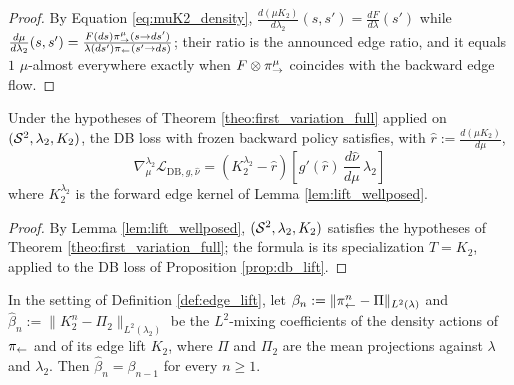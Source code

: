\begin{proof}
By Equation \eqref{eq:muK2_density}, $\frac{d(\mu K_2)}{d\lambda_2}(s,s') = \frac{dF}{d\lambda}(s')$ while $\frac{d\mu}{d\lambda_2}(s,s') = \frac{F(ds)\pi_{\rightarrow}^\mu(s\rightarrow ds')}{\lambda(ds')\pi_{\leftarrow}(s'\rightarrow ds)}$; their ratio is the announced edge ratio, and it equals $1$ $\mu$-almost everywhere exactly when $F\otimes\pi_{\rightarrow}^\mu$ coincides with the backward edge flow.
\end{proof}

\begin{corollary}[DB gradient]\label{cor:db_gradient}
Under the hypotheses of Theorem \ref{theo:first_variation_full} applied on $(\mathcal S^2,\lambda_2, K_2)$, the DB loss with frozen backward policy satisfies, with $\widehat r := \frac{d(\mu K_2)}{d\mu}$,
\begin{equation}
    \nabla^{\lambda_2}_{\mu} \mathcal L_{\mathrm{DB},g,\widehat\nu}
    = \left(K_2^{\lambda_2} - \widehat r\right)\left[ g'(\widehat r)\, \frac{d\widehat\nu}{d\mu}\,\lambda_2 \right]
\end{equation}
where $K_2^{\lambda_2}$ is the forward edge kernel of Lemma \ref{lem:lift_wellposed}.
\end{corollary}

\begin{proof}
By Lemma \ref{lem:lift_wellposed}, $(\mathcal S^2,\lambda_2,K_2)$ satisfies the hypotheses of Theorem \ref{theo:first_variation_full}; the formula is its specialization $T=K_2$, applied to the DB loss of Proposition \ref{prop:db_lift}.
\end{proof}

\begin{lemma}\label{lem:lift_mixing}
In the setting of Definition \ref{def:edge_lift}, let $\beta_n:=\|\pi_{\leftarrow}^n-\Pi\|_{L^2(\lambda)}$ and $\widehat\beta_n:=\|K_2^n-\Pi_2\|_{L^2(\lambda_2)}$ be the $L^2$-mixing coefficients of the density actions of $\pi_{\leftarrow}$ and of its edge lift $K_2$, where $\Pi$ and $\Pi_2$ are the mean projections against $\lambda$ and $\lambda_2$. Then $\widehat\beta_n = \beta_{n-1}$ for every $n\geq 1$.
\end{lemma}

